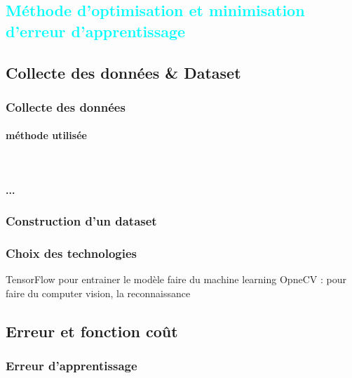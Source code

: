 			


%
%



\textcolor{cyan}{\chapter{Méthode d'optimisation et minimisation d'erreur d'apprentissage}}	
	\section{Collecte des données \& Dataset }
	
	\subsection{Collecte des données}
	\lipsum[1]
	\lipsum[2]
	\subsubsection{méthode utilisée}
	\lipsum[1]\\
	
	\subsubsection{...}
	\lipsum[1]
	\subsection{Construction d'un dataset}
	\lipsum[1]
	\subsection{Choix des technologies}
	\lipsum[1]
	TensorFlow pour entrainer le modèle faire du machine learning
	OpneCV : pour faire du computer vision, la reconnaissance 

	\section{Erreur et fonction coût}
	\lipsum[1]
	\subsection{Erreur d'apprentissage}
	\lipsum[1]
	
